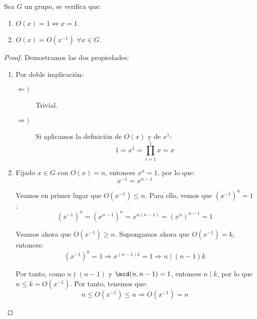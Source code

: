 \begin{prop}
    Sea $G$ un grupo, se verifica que:
    \begin{enumerate}
        \item $O(x)=1\Longleftrightarrow x=1$.
        \item $O(x)=O(x^{-1})$ $\forall x\in G$.
    \end{enumerate}
    \begin{proof}
        Demostramos las dos propiedades:
        \begin{enumerate}
            \item Por doble implicación:
                \begin{description}
                    \item [$\Longleftarrow)$] Trivial.
                    \item [$\Longrightarrow)$] Si aplicamos la definición de $O(x)$ y de $x^1$:
                        \begin{equation*}
                            1 = x^1 = \prod_{i=1}^{1} x = x
                        \end{equation*}
                \end{description}
            \item %
            Fijado $x\in G$ con $O(x)=n$, entonces $x^n = 1$, por lo que:
            \begin{equation*}
                x^{-1} = x^{n-1}
            \end{equation*}

            Veamos en primer lugar que $O(x^{-1})\leq n$. Para ello, vemos que $\left(x^{-1}\right)^{n}=1$:
            \begin{equation*}
                \left(x^{-1}\right)^{n} = \left(x^{n-1}\right)^{n} = x^{n(n-1)} = {\left(x^n\right)}^{n-1}= 1
            \end{equation*}

            Veamos ahora que $O(x^{-1})\geq n$. Supongamos ahora que $O(x^{-1})=k$, entonces:
            \begin{equation*}
                (x^{-1})^k = 1 \Longrightarrow x^{(n-1)k} = 1 \Longrightarrow n\mid (n-1)k
            \end{equation*}

            Por tanto, como $n \nmid (n-1)$ y $\mcd(n,n-1)=1$, entonces $n\mid k$, por lo que $n\leq k=O(x^{-1})$. Por tanto, tenemos que:
            \begin{equation*}
                n\leq O(x^{-1})\leq n \Longrightarrow O(x^{-1}) = n
            \end{equation*}
        \end{enumerate}
    \end{proof}
\end{prop}

